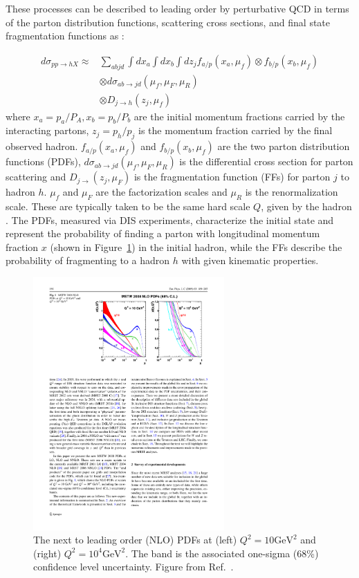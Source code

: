 These processes can be described to leading order by perturbative QCD in terms of the parton distribution functions, scattering cross sections, and final state fragmentation functions as \cite{Qin:2015srf}:

\begin{align}
\label{eq:hadronCS}
d \sigma_{pp \rightarrow hX} \approx & \sum_{abjd} \int dx_a \int dx_b \int dz_j f_{a/p} (x_a, \mu_f) \otimes f_{b/p} (x_b, \mu_f) \\
& \otimes d\sigma_{ab\rightarrow jd} (\mu_f, \mu_F, \mu_R)  \nonumber \\
& \otimes D_{j \rightarrow h} (z_j, \mu_f) \nonumber
\end{align}
where $x_a = p_a/P_A, x_b = p_b / P_b$ are the initial momentum fractions carried by the interacting partons, $z_j = p_h / p_j$ is the momentum fraction carried by the final observed hadron.
$f_{a/p} (x_a, \mu_f)$ and $f_{b/p} (x_b, \mu_f)$ are the two parton distribution functions (PDFs), $d\sigma_{ab\rightarrow jd} (\mu_f, \mu_F, \mu_R)$ is the differential cross section for parton scattering and $D_{j\rightarrow }(z_j,\mu_F)$ is the fragmentation function (FFs) for parton $j$ to hadron $h$.
$\mu_f$ and $\mu_F$ are the factorization scales and $\mu_R$ is the renormalization scale.
These are typically taken to be the same hard scale $Q$, given by the hadron \pt.
The PDFs, measured via DIS experiments, characterize the initial state and represent the probability of finding a parton with longitudinal momentum fraction $x$ (shown in Figure~\ref{fig:bjorkenX}) in the initial hadron, while the FFs describe the probability of fragmenting to a hadron $h$ with given kinematic properties.

\begin{figure}[htbp]
\begin{center}
\includegraphics[width=0.65\textwidth]{figures/theory/bjorkenX}
\caption{The next to leading order (NLO) PDFs at (left) $Q^2 = 10 \mathrm{GeV}^2$ and (right) $Q^2 = 10^4 \mathrm{GeV}^2$.
The band is the associated one-sigma (68\%) confidence level uncertainty.
Figure from Ref.~\cite{Martin2009}.}
\label{fig:bjorkenX}
\end{center}
\end{figure}
 
